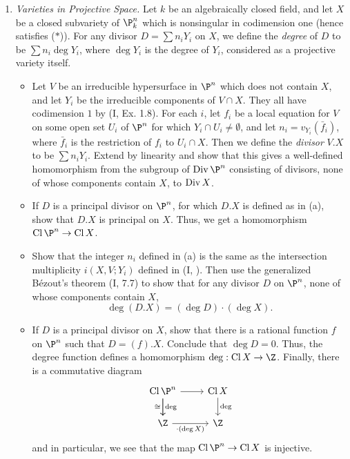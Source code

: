 \documentclass[a4paper]{article}
\begin{document}
\begin{enumerate} [label=\textbf{\arabic*.}, leftmargin=0em]
\item[\textbf{2.}] \textit{Varieties in Projective Space.} Let $k$ be an algebraically closed field, and let $X$ be a closed subvariety of $\P_k^n$ which is nonsingular in codimension one (hence satisfies ($*$)). For any divisor $D = \sum n_i Y_i$ on $X$, we define the \textit{degree} of $D$ to be $\sum n_i \deg Y_i$, where $\deg Y_i$ is the degree of $Y_i$, considered as a projective variety itself.
\begin{itemize}
    \item[(a)] Let $V$ be an irreducible hypersurface in $\P^n$ which does not contain $X$, and let $Y_i$ be the irreducible components of $V \cap X$. They all have codimension $1$ by (I, Ex. 1.8). For each $i$, let $f_i$ be a local equation for $V$ on some open set $U_i$ of $\P^n$ for which $Y_i \cap U_i \neq \emptyset$, and let $n_i = v_{Y_i}(\bar{f}_i)$, where $\bar{f}_i$ is the restriction of $f_i$ to $U_i \cap X$. Then we define the \textit{divisor} $V.X$ to be $\sum n_i Y_i$. Extend by linearity and show that this gives a well-defined homomorphism from the subgroup of $\Div \P^n$ consisting of divisors, none of whose components contain $X$, to $\operatorname{Div} X$.
    \item[(b)] If $D$ is a principal divisor on $\P^n$, for which $D.X$ is defined as in (a), show that $D.X$ is principal on $X$. Thus, we get a homomorphism $\cl\P^n \to \cl X$.
    \item[(c)] Show that the integer $n_i$ defined in (a) is the same as the intersection multiplicity $i(X, V; Y_i)$ defined in (I, ). Then use the generalized Bézout's theorem (I, 7.7) to show that for any divisor $D$ on $\P^n$, none of whose components contain $X$,
    \begin{equation*}
        \deg(D.X) = (\deg D) \cdot (\deg X).
    \end{equation*}
    \item[(d)] If $D$ is a principal divisor on $X$, show that there is a rational function $f$ on $\P^n$ such that $D = (f).X$. Conclude that $\deg D = 0$. Thus, the degree function defines a homomorphism $\deg : \cl X \to \Z$. Finally, there is a commutative diagram
    \[\begin{tikzcd}
        \cl \P^n \arrow[r] \arrow[d, "\cong"'] \arrow[d, "\deg "] & \cl X \arrow[d, "\deg"] \\
        \Z \arrow[r, "\cdot(\deg X)"']                                  & \Z                                 
        \end{tikzcd} \]
    and in particular, we see that the map $\cl \P^n \to \cl X$ is injective.
\end{itemize}


\end{enumerate}
\end{document}
